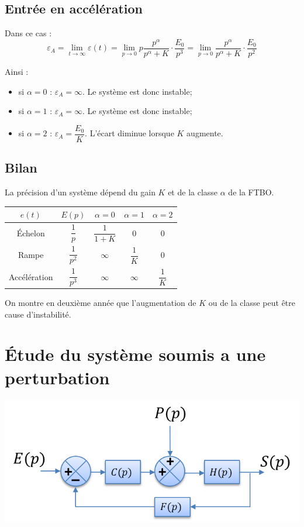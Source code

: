 \documentclass[10pt,fleqn]{article} %
\begin{document}
\subsection{Entrée en accélération}
Dans ce cas : 
$$
\varepsilon_A =
\lim\limits_{t\to \infty} \varepsilon(t) 
= \lim\limits_{p\to 0} p \dfrac{p^\alpha}{p^\alpha+K} \cdot \dfrac{E_0}{p^3}
= \lim\limits_{p\to 0}  \dfrac{p^\alpha}{p^\alpha+K} \cdot \dfrac{E_0}{p^2}
$$

Ainsi :
\begin{itemize}
\item si $\alpha=0$ : $\varepsilon_A = \infty$. Le système est donc instable;
\item si $\alpha=1$ : $\varepsilon_A = \infty$. Le système est donc instable;
\item si $\alpha=2$ : $\varepsilon_A = \dfrac{E_0}{K}$. L'écart diminue lorsque $K$ augmente.
\end{itemize}

\newpage 

\subsection{Bilan}

\begin{resultat}
La précision d'un système dépend du gain $K$ et de la classe $\alpha$ de la FTBO. 
\begin{center}
\begin{tabular}{|c|c|c|c|c|}
\hline
$e(t)$ & $E(p)$ & $\alpha=0$ & $\alpha=1 $ & $\alpha=2$ \\
\hline
Échelon & $\dfrac{1}{p}$ & $\dfrac{1}{1+K}$ & 0 & 0 \\
\hline
Rampe & $\dfrac{1}{p^2}$ & $\infty$ & $\dfrac{1}{K}$ & 0 \\
\hline
Accélération & $\dfrac{1}{p^3}$ & $\infty$ & $\infty$ & $\dfrac{1}{K}$ \\
\hline
\end{tabular}
\end{center}
\end{resultat}

\begin{rem}
On montre en deuxième année que l'augmentation de $K$ ou de la classe peut être cause d'instabilité.
\end{rem}


\section{Étude du système soumis a une perturbation}
\begin{center}
\includegraphics[width=.5\textwidth]{images/bloc1.png}
\end{center}
\end{document}
